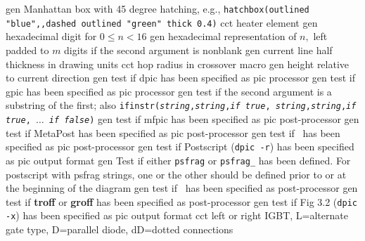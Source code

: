   {gen}
  {Manhattan box with 45 degree hatching, e.g.,
   {\tt hatchbox(outlined "blue",,dashed outlined "green" thick 0.4)}}
  {cct}
  {heater element}
  {gen}
  {hexadecimal digit for $0 \leq n < 16$}
  {gen}
  {hexadecimal representation of $n,$ left padded to $m$ digits if the second
   argument is nonblank}
  {gen}
  {current line half thickness in drawing units}
  {cct}
  {hop radius in crossover macro}
  {gen}
  {height relative to current direction}
%
  {gen}
  {test if dpic has been specified as pic processor}
  {gen}
  {test if gpic has been specified as pic processor}
  {gen}
  {test if the second argument is a substring of the first; also
  {\tt ifinstr({\sl string},{\sl string},{\sl if true},{\sl
  string},{\sl string},{\sl if true}, $\ldots$ {\sl if false})}
    }
  {gen}
  {test if mfpic has been specified as pic post-processor}
  {gen}
  {test if MetaPost has been specified as pic post-processor}
  {gen}
  {test if \TPGF~has been specified as pic post-processor}
  {gen}
  {test if Postscript ({\tt dpic -r}) has been specified as pic output format}
  {gen}
  {Test if either {\tt psfrag} or {\tt psfrag\_} has been defined. For
   postscript with psfrag strings, one or the other should be defined
   prior to or at the beginning of the diagram}
  {gen}
  {test if \PSTricks~has been specified as post-processor}
  {gen}
  {test if {\bf troff} or {\bf groff} has been specified as post-processor}
  {gen}
  {test if Fig 3.2 ({\tt dpic -x}) has been specified as pic output format}
  {cct}
  {left or right IGBT, L=alternate gate type, D=parallel diode,
   dD=dotted connections }
